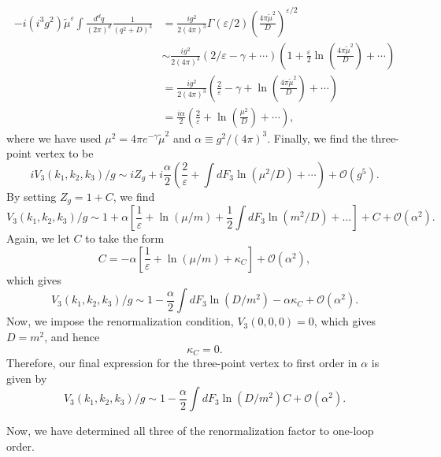 \begin{equation}
\begin{aligned}
    -i(i^3g^2)\tilde{\mu}^{\varepsilon}\int\frac{d^dq}{(2\pi)^d}\frac{1}{(q^2+D)^3} &=\frac{ig^2}{2(4\pi)^3}\Gamma(\varepsilon/2)\left(\frac{4\pi \tilde{\mu}^2}{D}\right)^{\varepsilon/2}\\
    &\sim\frac{ig^2}{2(4\pi)^3}(2/\varepsilon-\gamma+\cdots)\left(1+\frac{\varepsilon}{2}\ln\left(\frac{4\pi \tilde{\mu}^2}{D}\right)+ \cdots\right)\\
    &=\frac{ig^2}{2(4\pi)^3}\left(\frac{2}{\varepsilon}-\gamma +\ln\left(\frac{4\pi \tilde{\mu}^2}{D}\right) + \cdots\right)\\
    &=\frac{i\alpha}2\left(\frac{2}{\varepsilon}+\ln\left(\frac{\mu^2}{D}\right) + \cdots\right),
\end{aligned}
\end{equation}
where we have used $\mu^2 = 4\pi e^{-\gamma}\tilde{\mu}^2$ and $\alpha \equiv g^2/(4\pi)^3$. Finally, we find the three-point vertex to be
\begin{equation}
    iV_3(k_1, k_2,k_3)/g \sim iZ_g  + i\frac{\alpha}{2}\left(\frac{2}{\varepsilon} + \int dF_3\ln(\mu^2/D) + \cdots \right) + \mathcal{O}(g^5).
\end{equation}
By setting $Z_g = 1 +C$, we find
\begin{equation}
    V_3(k_1, k_2,k_3)/g \sim 1 + \alpha\left[\frac{1}{\varepsilon}+\ln(\mu/m)+\frac{1}{2}\int dF_3\ln(m^2/D) + \dots\right] +C + \mathcal{O}(\alpha^2).
\end{equation}
Again, we let $C$ to take the form
\begin{equation}
    C = -\alpha\left[\frac{1}{\varepsilon}+\ln(\mu/m) + \kappa_C\right] + \mathcal{O}(\alpha^2),
\end{equation}
which gives
\begin{equation}
    V_3(k_1, k_2,k_3)/g \sim 1 - \frac{\alpha}{2}\int dF_3\ln (D/m^2) -\alpha\kappa_C  + \mathcal{O}(\alpha^2).
\end{equation}
Now, we impose the renormalization condition, $V_3(0,0,0) = 0$, which gives $D = m^2$, and hence
\begin{equation}
    \kappa_C= 0.
\end{equation}
Therefore, our final expression for the three-point vertex to first order in $\alpha$ is given by
\begin{equation}
    V_3(k_1, k_2,k_3)/g \sim 1 - \frac{\alpha}{2}\int dF_3\ln (D/m^2)C  + \mathcal{O}(\alpha^2).
\end{equation}

Now, we have determined all three of the renormalization factor to one-loop order.


